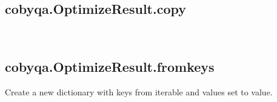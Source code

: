 \documentclass[letterpaper,10pt,english]{sphinxmanual}
\begin{document}
\begin{fulllineitems}
\begin{fulllineitems}
\label{\detokenize{refs/generated/cobyqa.OptimizeResult.clear:cobyqa.OptimizeResult.clear}}~
\end{fulllineitems}



\subsection{cobyqa.OptimizeResult.copy}
\label{\detokenize{refs/generated/cobyqa.OptimizeResult.copy:cobyqa-optimizeresult-copy}}\label{\detokenize{refs/generated/cobyqa.OptimizeResult.copy::doc}}

\begin{fulllineitems}
\label{\detokenize{refs/generated/cobyqa.OptimizeResult.copy:cobyqa.OptimizeResult.copy}}~
\end{fulllineitems}



\subsection{cobyqa.OptimizeResult.fromkeys}
\label{\detokenize{refs/generated/cobyqa.OptimizeResult.fromkeys:cobyqa-optimizeresult-fromkeys}}\label{\detokenize{refs/generated/cobyqa.OptimizeResult.fromkeys::doc}}

\begin{fulllineitems}
\label{\detokenize{refs/generated/cobyqa.OptimizeResult.fromkeys:cobyqa.OptimizeResult.fromkeys}}
\sphinxAtStartPar
Create a new dictionary with keys from iterable and values set to value.

\end{fulllineitems}




\end{fulllineitems}
\end{document}
